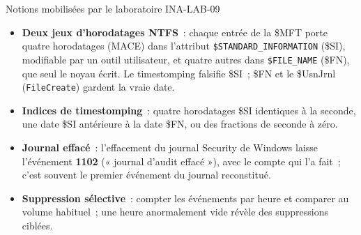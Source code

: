 \begin{boiteRemarque}{Notions mobilisées par le laboratoire INA-LAB-09}
\begin{itemize}
    \item \textbf{Deux jeux d'horodatages NTFS}~: chaque entrée de la
          \$MFT porte quatre horodatages (MACE) dans l'attribut
          \texttt{\$STANDARD\_INFORMATION} (\$SI), modifiable par un outil
          utilisateur, et quatre autres dans \texttt{\$FILE\_NAME} (\$FN),
          que seul le noyau écrit. Le timestomping falsifie \$SI~; \$FN et
          le \$UsnJrnl (\texttt{FileCreate}) gardent la vraie date.
    \item \textbf{Indices de timestomping}~: quatre horodatages \$SI
          identiques à la seconde, une date \$SI antérieure à la date \$FN,
          ou des fractions de seconde à zéro.
    \item \textbf{Journal effacé}~: l'effacement du journal Security de
          Windows laisse l'événement \textbf{1102} (« journal d'audit
          effacé »), avec le compte qui l'a fait~; c'est souvent le premier
          événement du journal reconstitué.
    \item \textbf{Suppression sélective}~: compter les événements par heure
          et comparer au volume habituel~; une heure anormalement vide
          révèle des suppressions ciblées.
\end{itemize}
\end{boiteRemarque}

